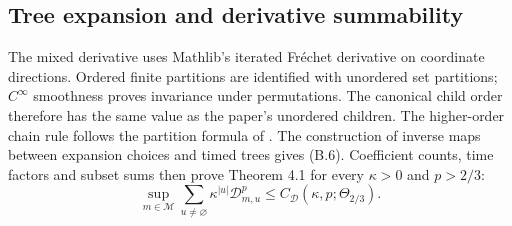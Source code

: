 \documentclass[11pt,a4paper]{article}
\begin{document}
\subsection{Tree expansion and derivative summability}
The mixed derivative uses Mathlib's iterated Fr\'echet derivative on
coordinate directions. Ordered finite partitions are identified with
unordered set partitions; $C^\infty$ smoothness proves invariance under
permutations. The canonical child order therefore has the same value
as the paper's unordered children.
The higher-order chain rule follows the partition formula of
\cite[Theorem~1]{levy2006why}.
The construction of inverse maps between expansion choices and timed
trees gives (B.6). Coefficient counts, time factors and subset sums then
prove Theorem 4.1 for every $\kappa>0$ and $p>2/3$:
\[
 \sup_{m\in\mathcal M}\sum_{u\ne\varnothing}
       \kappa^{|u|}\mathcal D_{m,u}^p
 \le C_{\mathcal D}(\kappa,p;\Theta_{2/3}).
\]
\end{document}
